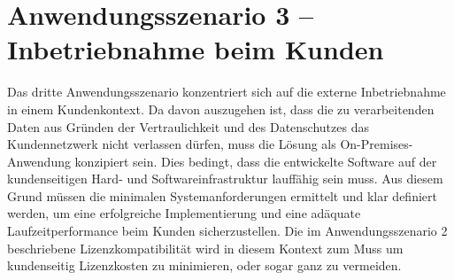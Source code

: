 \section{Anwendungsszenario 3 -- Inbetriebnahme beim Kunden}\label{sec:anwendungsszenario-3}

Das dritte Anwendungsszenario konzentriert sich auf die externe Inbetriebnahme in einem Kundenkontext.
Da davon auszugehen ist, dass die zu verarbeitenden Daten aus Gründen der Vertraulichkeit und des Datenschutzes das Kundennetzwerk nicht verlassen dürfen, muss die Lösung als On-Premises-Anwendung konzipiert sein.
Dies bedingt, dass die entwickelte Software auf der kundenseitigen Hard- und Softwareinfrastruktur lauffähig sein muss.
Aus diesem Grund müssen die minimalen Systemanforderungen ermittelt und klar definiert werden, um eine erfolgreiche Implementierung und eine adäquate Laufzeitperformance beim Kunden sicherzustellen.
Die im Anwendungsszenario 2 beschriebene Lizenzkompatibilität wird in diesem Kontext zum Muss um kundenseitig Lizenzkosten zu minimieren, oder sogar ganz zu vermeiden.
